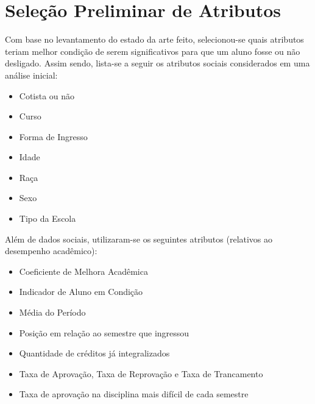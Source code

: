 \section{Seleção Preliminar de Atributos}
Com base no levantamento do estado da arte feito, selecionou-se quais atributos
teriam melhor condição de serem significativos para que um aluno fosse ou não
desligado. Assim sendo, lista-se a seguir os atributos sociais considerados em uma análise
inicial:
\begin{itemize}
        \item Cotista ou não
        \item Curso
        \item Forma de Ingresso
        \item Idade
        \item Raça
        \item Sexo
        \item Tipo da Escola 
\end{itemize}

Além de dados sociais, utilizaram-se os seguintes atributos (relativos ao desempenho
acadêmico): 
\begin{itemize}
    \item Coeficiente de Melhora Acadêmica
    \item Indicador de Aluno em Condição
    \item Média do Período
    \item Posição em relação ao semestre que ingressou
    \item Quantidade de créditos já integralizados
    \item Taxa de Aprovação, Taxa de Reprovação e Taxa de Trancamento
    \item Taxa de aprovação na disciplina mais difícil de cada semestre
\end{itemize}

